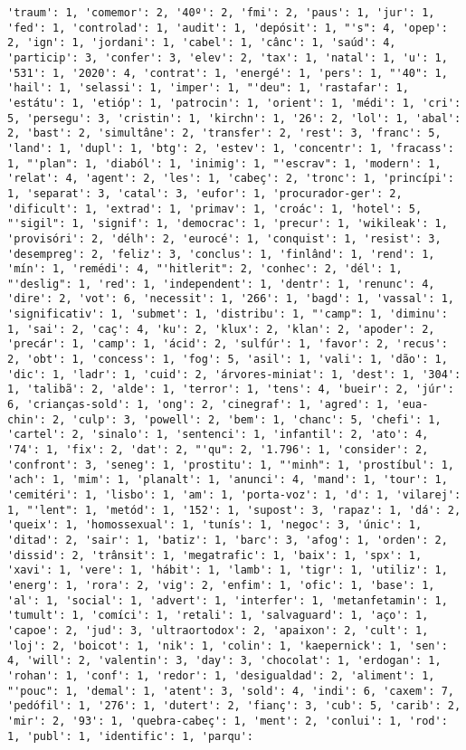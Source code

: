 \documentclass[11pt]{article}
\begin{document}
\begin{Verbatim}[commandchars=\\\{\}]
'traum': 1, 'comemor': 2, '40º': 2, 'fmi': 2, 'paus': 1, 'jur': 1, 'fed': 1, 'controlad': 1, 'audit': 1, 'depósit': 1, "'s": 4, 'opep': 2, 'ign': 1, 'jordani': 1, 'cabel': 1, 'cânc': 1, 'saúd': 4, 'particip': 3, 'confer': 3, 'elev': 2, 'tax': 1, 'natal': 1, 'u': 1, '531': 1, '2020': 4, 'contrat': 1, 'energé': 1, 'pers': 1, "'40": 1, 'hail': 1, 'selassi': 1, 'imper': 1, "'deu": 1, 'rastafar': 1, 'estátu': 1, 'etióp': 1, 'patrocin': 1, 'orient': 1, 'médi': 1, 'cri': 5, 'persegu': 3, 'cristin': 1, 'kirchn': 1, '26': 2, 'lol': 1, 'abal': 2, 'bast': 2, 'simultâne': 2, 'transfer': 2, 'rest': 3, 'franc': 5, 'land': 1, 'dupl': 1, 'btg': 2, 'estev': 1, 'concentr': 1, 'fracass': 1, "'plan": 1, 'diaból': 1, 'inimig': 1, "'escrav": 1, 'modern': 1, 'relat': 4, 'agent': 2, 'les': 1, 'cabeç': 2, 'tronc': 1, 'princípi': 1, 'separat': 3, 'catal': 3, 'eufor': 1, 'procurador-ger': 2, 'dificult': 1, 'extrad': 1, 'primav': 1, 'croác': 1, 'hotel': 5, "'sigil": 1, 'signif': 1, 'democrac': 1, 'precur': 1, 'wikileak': 1, 'provisóri': 2, 'délh': 2, 'eurocé': 1, 'conquist': 1, 'resist': 3, 'desempreg': 2, 'feliz': 3, 'conclus': 1, 'finlând': 1, 'rend': 1, 'mín': 1, 'remédi': 4, "'hitlerit": 2, 'conhec': 2, 'dél': 1, "'deslig": 1, 'red': 1, 'independent': 1, 'dentr': 1, 'renunc': 4, 'dire': 2, 'vot': 6, 'necessit': 1, '266': 1, 'bagd': 1, 'vassal': 1, 'significativ': 1, 'submet': 1, 'distribu': 1, "'camp": 1, 'diminu': 1, 'sai': 2, 'caç': 4, 'ku': 2, 'klux': 2, 'klan': 2, 'apoder': 2, 'precár': 1, 'camp': 1, 'ácid': 2, 'sulfúr': 1, 'favor': 2, 'recus': 2, 'obt': 1, 'concess': 1, 'fog': 5, 'asil': 1, 'vali': 1, 'dão': 1, 'dic': 1, 'ladr': 1, 'cuid': 2, 'árvores-miniat': 1, 'dest': 1, '304': 1, 'talibã': 2, 'alde': 1, 'terror': 1, 'tens': 4, 'bueir': 2, 'júr': 6, 'crianças-sold': 1, 'ong': 2, 'cinegraf': 1, 'agred': 1, 'eua-chin': 2, 'culp': 3, 'powell': 2, 'bem': 1, 'chanc': 5, 'chefi': 1, 'cartel': 2, 'sinalo': 1, 'sentenci': 1, 'infantil': 2, 'ato': 4, '74': 1, 'fix': 2, 'dat': 2, "'qu": 2, '1.796': 1, 'consider': 2, 'confront': 3, 'seneg': 1, 'prostitu': 1, "'minh": 1, 'prostíbul': 1, 'ach': 1, 'mim': 1, 'planalt': 1, 'anunci': 4, 'mand': 1, 'tour': 1, 'cemitéri': 1, 'lisbo': 1, 'am': 1, 'porta-voz': 1, 'd': 1, 'vilarej': 1, "'lent": 1, 'metód': 1, '152': 1, 'supost': 3, 'rapaz': 1, 'dá': 2, 'queix': 1, 'homossexual': 1, 'tunís': 1, 'negoc': 3, 'únic': 1, 'ditad': 2, 'sair': 1, 'batiz': 1, 'barc': 3, 'afog': 1, 'orden': 2, 'dissid': 2, 'trânsit': 1, 'megatrafic': 1, 'baix': 1, 'spx': 1, 'xavi': 1, 'vere': 1, 'hábit': 1, 'lamb': 1, 'tigr': 1, 'utiliz': 1, 'energ': 1, 'rora': 2, 'vig': 2, 'enfim': 1, 'ofic': 1, 'base': 1, 'al': 1, 'social': 1, 'advert': 1, 'interfer': 1, 'metanfetamin': 1, 'tumult': 1, 'comíci': 1, 'retali': 1, 'salvaguard': 1, 'aço': 1, 'capoe': 2, 'jud': 3, 'ultraortodox': 2, 'apaixon': 2, 'cult': 1, 'loj': 2, 'boicot': 1, 'nik': 1, 'colin': 1, 'kaepernick': 1, 'sen': 4, 'will': 2, 'valentin': 3, 'day': 3, 'chocolat': 1, 'erdogan': 1, 'rohan': 1, 'conf': 1, 'redor': 1, 'desigualdad': 2, 'aliment': 1, "'pouc": 1, 'demal': 1, 'atent': 3, 'sold': 4, 'indi': 6, 'caxem': 7, 'pedófil': 1, '276': 1, 'dutert': 2, 'fianç': 3, 'cub': 5, 'carib': 2, 'mir': 2, '93': 1, 'quebra-cabeç': 1, 'ment': 2, 'conlui': 1, 'rod': 1, 'publ': 1, 'identific': 1, 'parqu': 
\end{Verbatim}
\end{document}
